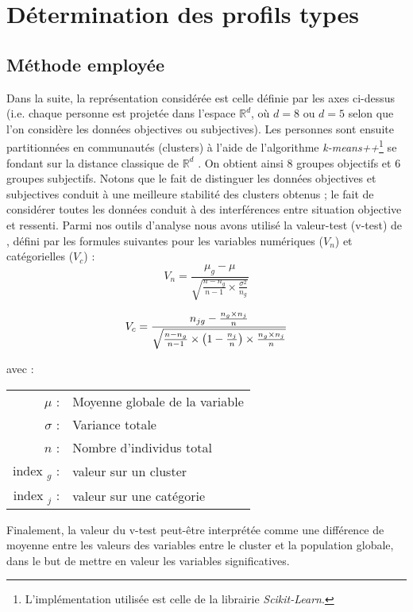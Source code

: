 \documentclass[11pt,fleqn,openany,frenchb]{book} %
\begin{document}
\section{Détermination des profils types}
\subsection{Méthode employée}
Dans la suite, la représentation considérée est celle définie par les axes ci-dessus (i.e. chaque personne est projetée dans l'espace $\mathbb{R}^d$, où $d=8$ ou $d=5$ selon que l'on considère les données objectives ou subjectives). Les personnes sont ensuite partitionnées en communautés (clusters) à l'aide de l'algorithme \textit{k-means++}\footnote{L'implémentation utilisée est celle de la librairie \textit{Scikit-Learn}.} se fondant sur la distance classique de $\mathbb{R}^d$ \cite{arthur2007k}.  On obtient ainsi 8 groupes objectifs et 6 groupes subjectifs. Notons que le fait de distinguer les données objectives et subjectives conduit à une meilleure stabilité des clusters obtenus ; le fait de considérer toutes les données conduit à des interférences entre situation objective et ressenti. Parmi nos outils d'analyse nous avons utilisé la valeur-test (v-test) de \cite{lebart2006statistique}, défini par les formules suivantes pour les variables numériques ($V_n$) et catégorielles ($V_c$) : 
 $$ V_n= \frac{\mu_g-\mu}{\sqrt{\frac{n-n_g}{n-1}\times\frac{\sigma^2}{n_g}}} $$

$$ V_c= \frac{n_{jg}-\frac{n_g\times n_j}{n}}{\sqrt{\frac{n-n_g}{n-1}\times\left( 1-\frac{n_j}{n} \right) \times\frac{n_g\times n_j}{n}}} \vspace{0.2cm}$$

avec : \\
 \begin{tabular}{r l}
 $\mu$ :& Moyenne globale de la variable \\
 $\sigma$ :& Variance totale \\
 $n$ :& Nombre d'individus total\\
 index $_g$ :& valeur sur un cluster \\
 index $_j$ :& valeur sur une catégorie\vspace{0.2cm}\\
 \end{tabular}
 
 Finalement, la valeur du v-test peut-être interprétée comme une différence de moyenne entre les valeurs des variables entre le cluster et la population globale, dans le but de mettre en valeur les variables significatives.
 
\end{document}
